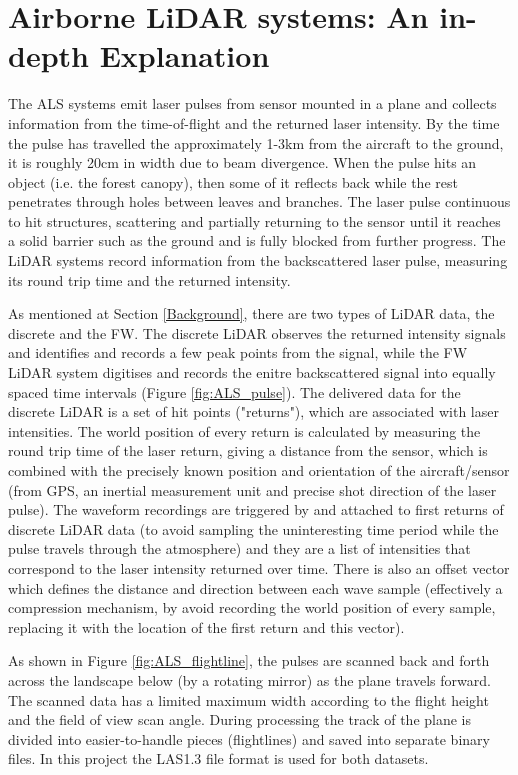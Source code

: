 \documentclass{subfiles}
\begin{document}
    \section{Airborne LiDAR systems: An in-depth Explanation}\label{sec:ALS}
     
        
    
    The ALS systems emit laser pulses from sensor mounted in a plane and collects information from the time-of-flight and the returned laser intensity.  By the time the pulse has travelled the approximately 1-3km from the aircraft to the ground, it is roughly 20cm in width due to beam divergence.  When the pulse hits an object (i.e. the forest canopy), then some of it reflects back while the rest penetrates through holes between leaves and branches. The laser pulse continuous to hit structures, scattering and partially returning to the sensor until it reaches a solid barrier such as the ground and is fully blocked from further progress.  The LiDAR systems record information from the backscattered laser pulse, measuring its round trip time and the returned intensity.
     
     As mentioned at Section \ref{Background}, there are two types of LiDAR data, the discrete and the FW. The discrete LiDAR observes the returned intensity signals and identifies and records a few peak points from the signal, while the FW LiDAR system digitises and records the enitre backscattered signal into equally spaced time intervals (Figure \ref{fig:ALS_pulse}). The delivered data for the discrete LiDAR is a set of hit points ("returns"), which are associated with laser intensities. The world position of every return is calculated by measuring the round trip time of the laser return, giving a distance from the sensor, which is combined with the precisely known position and orientation of the aircraft/sensor (from GPS, an inertial measurement unit and precise shot direction of the laser pulse). The waveform recordings are triggered by and attached to first returns of discrete LiDAR data (to avoid sampling the uninteresting time period while the pulse travels through the atmosphere) and they are a list of intensities that correspond to the laser intensity returned over time. There is also an offset vector which defines the distance and direction between each wave sample (effectively a compression mechanism, by avoid recording the world position of every sample, replacing it with the location of the first return and this vector).
     
As shown in Figure \ref{fig:ALS_flightline}, the pulses are scanned back and forth across the landscape below (by a rotating mirror) as the plane travels forward.  The scanned data has a limited maximum width according to the flight height and the field of view scan angle. During processing the track of the plane is divided into easier-to-handle pieces (flightlines) and saved into separate binary files. In this project the LAS1.3 file format is used for both datasets. 
      
\end{document}
